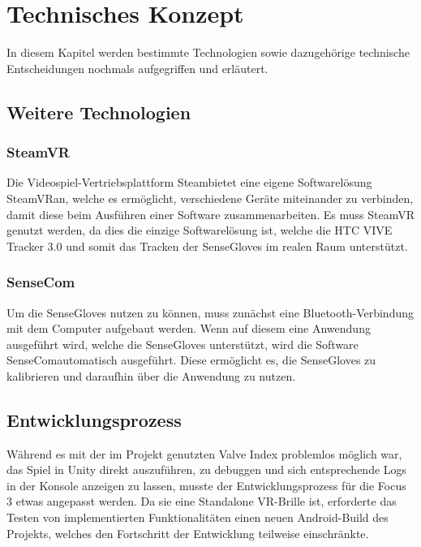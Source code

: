 \chapter{Technisches Konzept}
In diesem Kapitel werden bestimmte Technologien sowie dazugehörige technische Entscheidungen nochmals aufgegriffen und erläutert.
\section{Weitere Technologien}
\subsection{SteamVR}
Die Videospiel-Vertriebsplattform \dq Steam\dq bietet eine eigene Softwarelösung \dq SteamVR\dq an, welche es ermöglicht, verschiedene Geräte miteinander zu verbinden, damit diese beim Ausführen einer Software zusammenarbeiten. Es muss SteamVR genutzt werden, da dies die einzige Softwarelösung ist, welche die HTC VIVE Tracker 3.0 und somit das Tracken der SenseGloves im realen Raum unterstützt.
\subsection{SenseCom}
Um die SenseGloves nutzen zu können, muss zunächst eine Bluetooth-Verbindung mit dem Computer aufgebaut werden. Wenn auf diesem eine Anwendung ausgeführt wird, welche die SenseGloves unterstützt, wird die Software \dq SenseCom\dq automatisch ausgeführt. Diese ermöglicht es, die SenseGloves zu kalibrieren und daraufhin über die Anwendung zu nutzen.

\section{Entwicklungsprozess}
Während es mit der im Projekt genutzten Valve Index problemlos möglich war, das Spiel in Unity direkt auszuführen, zu debuggen und sich entsprechende Logs in der Konsole anzeigen zu lassen, musste der Entwicklungsprozess für die Focus 3 etwas angepasst werden. Da sie eine Standalone VR-Brille ist, erforderte das Testen von implementierten Funktionalitäten einen neuen Android-Build des Projekts, welches den Fortschritt der Entwicklung teilweise einschränkte.

